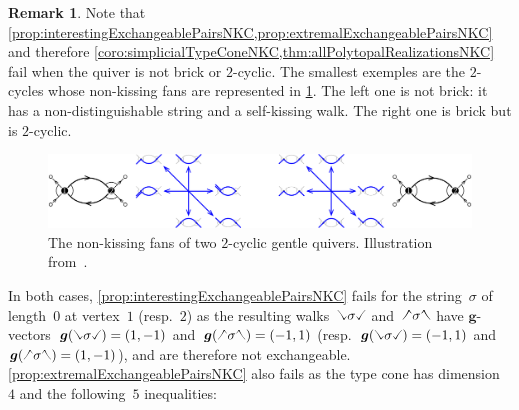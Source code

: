 \documentclass{amsart}
\theoremstyle{definition}
\newtheorem{remark}[theorem]{Remark}
\renewcommand{\b}[1]{{\boldsymbol{#1}}} %
\newcommand{\vincent}[1]{\todo[color=blue!30]{#1 \\ \hfill --- V.}}
\newcommand{\gvector}[1]{\b{g}(#1)} %
\newcommand{\hL}{\text{\rotatebox[origin=c]{180}{\checked}}}
\newcommand{\hR}{\text{\rotatebox[origin=c]{180}{\reflectbox{\checked}}}}
\newcommand{\cL}{\text{\reflectbox{\checked}}}
\newcommand{\cR}{\text{\checked}}
\newcommand{\hh}[1]{\hL#1\hR} %
\newcommand{\cc}[1]{\cL#1\cR} %
\begin{document}

\begin{remark}
\label{exm:nonSimplicialTypeConeNKC}
Note that \cref{prop:interestingExchangeablePairsNKC,prop:extremalExchangeablePairsNKC} and therefore \cref{coro:simplicialTypeConeNKC,thm:allPolytopalRealizationsNKC} fail when the quiver is not brick or $2$-cyclic.
The smallest exemples are the $2$-cycles whose non-kissing fans are represented in \cref{fig:nonkissingFans2}.
The left one is not brick: it has a non-distinguishable string and a self-kissing walk.
The right one is brick but is $2$-cyclic.


\begin{figure}[h]
	\capstart
	\centerline{\includegraphics[scale=.45]{nonkissingFans2}}
	\caption{The non-kissing fans of two $2$-cyclic gentle quivers. Illustration from~\cite{PaluPilaudPlamondon-nonkissing}.}
	\label{fig:nonkissingFans2}
\end{figure}

In both cases, \cref{prop:interestingExchangeablePairsNKC} fails for the string~$\sigma$ of length~$0$ at vertex~$1$ (resp.~$2$) as the resulting walks~$\cc{\sigma}$ and~$\hh{\sigma}$ have $\b{g}$-vectors~$\gvector{\cc{\sigma}} = (1,-1)$ and~$\gvector{\hh{\sigma}} = (-1,1)$ (resp.~$\gvector{\cc{\sigma}} = (-1,1)$ and~$\gvector{\hh{\sigma}} = (1,-1)$), and are therefore not exchangeable.
\cref{prop:extremalExchangeablePairsNKC} also fails as the type cone has dimension~$4$ and the following~$5$ inequalities:


\end{remark}
\end{document}
